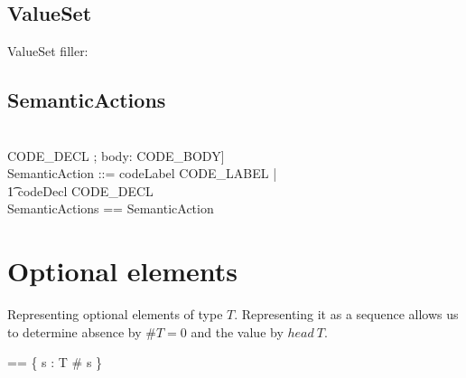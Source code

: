 \documentclass{article}
\begin{document}
\subsection{ValueSet}
\begin{schema}{ValueSet}
   filler: \nat
\end{schema}

\subsection{SemanticActions}
\begin{zed}
  \\
CODE\_DECL \defs [iri: \optional[IRI]; body: CODE\_BODY] \\
SemanticAction ::= codeLabel \ldata CODE\_LABEL \rdata | \\
\t1 codeDecl \ldata CODE\_DECL \rdata \\
SemanticActions == \power SemanticAction
\end{zed}




\section{Optional elements}
Representing optional elements of type $T$.  Representing it as a sequence allows us to
determine absence by $\#T = 0$ and the value by $head~T$. 

\begin{zed} 
  \optional[T] == \{ s : \seq T \mid \# s  \} 
\end{zed}
\end{document}
